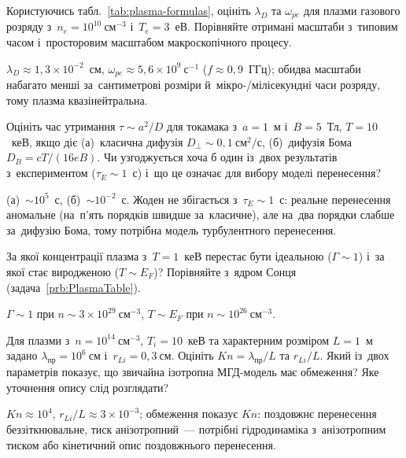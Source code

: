 \begin{problem}\label{prb:PlasmaFormulaCheck}
Користуючись табл.~\ref{tab:plasma-formulas}, оцініть $\lambda_D$
та $\omega_{pe}$ для плазми газового розряду з~$n_e=10^{10}~\mathrm{см}^{-3}$ і~$T_e=3$~еВ. Порівняйте отримані масштаби з~типовим
часом і~просторовим масштабом макроскопічного процесу.
	\begin{solution}
		$\lambda_D\approx1{,}3\times10^{-2}$~см, $\omega_{pe}\approx5{,}6\times10^{9}~\mathrm{с}^{-1}$ ($f\approx0{,}9$~ГГц);
обидва масштаби набагато менші за~сантиметрові розміри й~мікро-/мілісекундні часи розряду, тому плазма квазінейтральна.
	\end{solution}
\end{problem}

\begin{problem}\label{prb:ClassicalVsBohmTau}
Оцініть час утримання $\tau\sim a^2/D$ для токамака з~$a=1$~м і~$B=5$~Тл, $T=10$~кеВ, якщо
діє (а)~класична дифузія $D_\perp\sim0{,}1~\mathrm{см}^2/\mathrm{с}$, (б)~дифузія Бома $D_B=cT/(16eB)$.
Чи узгоджується хоча б один із~двох результатів з~експериментом ($\tau_E\sim1$~с) і~що це означає для вибору моделі перенесення?
	\begin{solution}
		(а)~$\sim10^{5}$~с, (б)~$\sim10^{-2}$~с. Жоден не збігається з~$\tau_E\sim1$~с: реальне перенесення аномальне
(на~п'ять порядків швидше за~класичне), але на~два порядки слабше за~дифузію Бома, тому потрібна модель турбулентного перенесення.
	\end{solution}
\end{problem}

\begin{problem}\label{prb:IdealDegenerate}
За якої концентрації плазма з~$T=1$~кеВ перестає бути ідеальною ($\Gamma\sim1$) і~за якої стає виродженою
($T\sim E_F$)? Порівняйте з~ядром Сонця (задача~\ref{prb:PlasmaTable}).
	\begin{solution}
		$\Gamma\sim1$ при $n\sim3\times10^{29}~\mathrm{см}^{-3}$, $T\sim E_F$ при $n\sim10^{26}~\mathrm{см}^{-3}$.
	\end{solution}
\end{problem}

\begin{problem}\label{prb:PlasmaModelLimits}
Для плазми з~$n=10^{14}~\mathrm{см}^{-3}$,
$T_i=10$~кеВ та характерним розміром $L=1$~м задано
$\lambda_{\mathrm{пр}}=10^6~\mathrm{см}$ і~$r_{Li}=0{,}3~\mathrm{см}$.
Оцініть $Kn=\lambda_{\mathrm{пр}}/L$ та $r_{Li}/L$. Який із~двох
параметрів показує, що звичайна ізотропна МГД-модель має обмеження?
Яке уточнення опису слід розглядати?
	\begin{solution}
		$Kn\approx10^{4}$, $r_{Li}/L\approx3\times10^{-3}$; обмеження показує $Kn$: поздовжнє перенесення
беззіткнювальне, тиск анізотропний~--- потрібні гідродинаміка з~анізотропним тиском або кінетичний опис поздовжнього перенесення.
	\end{solution}
\end{problem}

